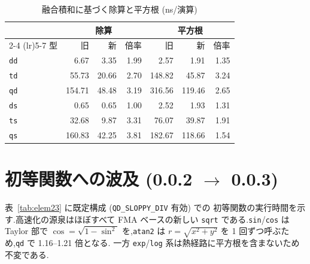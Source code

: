 \documentclass[a4paper,10pt]{ltjsarticle}
\begin{document}
\begin{table}[htbp]
\centering
\caption{融合積和に基づく除算と平方根 (ns/演算)}
\label{tab:kern2}
\begin{tabular}{l rrr rrr}
\toprule
 & \multicolumn{3}{c}{除算} & \multicolumn{3}{c}{平方根} \\
\cmidrule(lr){2-4} \cmidrule(lr){5-7}
型 & 旧 & 新 & 倍率 & 旧 & 新 & 倍率 \\
\midrule
\texttt{dd} & 6.67 & 3.35 & 1.99 & 2.57 & 1.91 & 1.35 \\
\texttt{td} & 55.73 & 20.66 & 2.70 & 148.82 & 45.87 & 3.24 \\
\texttt{qd} & 154.71 & 48.48 & 3.19 & 316.56 & 119.46 & 2.65 \\
\texttt{ds} & 0.65 & 0.65 & 1.00 & 2.52 & 1.93 & 1.31 \\
\texttt{ts} & 32.68 & 9.87 & 3.31 & 76.07 & 39.87 & 1.91 \\
\texttt{qs} & 160.83 & 42.25 & 3.81 & 182.67 & 118.66 & 1.54 \\
\bottomrule
\end{tabular}
\end{table}

\section{初等関数への波及 (0.0.2 $\to$ 0.0.3)}
\label{sec:elem23}

表~\ref{tab:elem23} に既定構成 (\texttt{QD\_SLOPPY\_DIV} 有効) での
初等関数の実行時間を示す.高速化の源泉はほぼすべて FMA ベースの新しい
\texttt{sqrt} である.\texttt{sin}/\texttt{cos} は Taylor 部で
$\cos = \sqrt{1-\sin^2}$ を,\texttt{atan2} は $r=\sqrt{x^2+y^2}$ を
1 回ずつ呼ぶため,\texttt{qd} で 1.16--1.21 倍となる.
一方 \texttt{exp}/\texttt{log} 系は熱経路に平方根を含まないため不変である.
\end{document}
